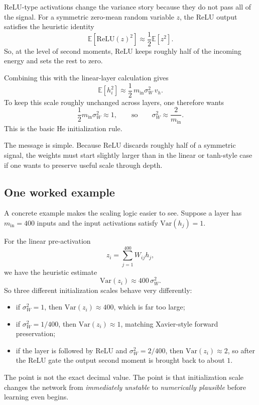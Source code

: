 ReLU-type activations change the variance story because they do not pass all of the signal.
For a symmetric zero-mean random variable $z$, the ReLU output satisfies the heuristic identity
\[
\mathbb E[\mathrm{ReLU}(z)^2] \approx \frac{1}{2}\mathbb E[z^2].
\]
So, at the level of second moments, ReLU keeps roughly half of the incoming energy and sets the rest to zero.

\medskip

Combining this with the linear-layer calculation gives
\[
\mathbb E[h_i^2]
\approx
\frac{1}{2}\,m_{\mathrm{in}}\sigma_W^2\,v_h.
\]
To keep this scale roughly unchanged across layers, one therefore wants
\[
\frac{1}{2}m_{\mathrm{in}}\sigma_W^2 \approx 1,
\qquad\text{so}
\qquad
\sigma_W^2 \approx \frac{2}{m_{\mathrm{in}}}.
\]
This is the basic He initialization rule.

\medskip

The message is simple.
Because ReLU discards roughly half of a symmetric signal, the weights must start slightly larger than in the linear or tanh-style case if one wants to preserve useful scale through depth.

\subsection*{One worked example}

A concrete example makes the scaling logic easier to see.
Suppose a layer has $m_{\mathrm{in}}=400$ inputs and the input activations satisfy $\mathrm{Var}(h_j)=1$.

\begin{example}
For the linear pre-activation
\[
z_i=\sum_{j=1}^{400}W_{ij}h_j,
\]
we have the heuristic estimate
\[
\mathrm{Var}(z_i)\approx 400\,\sigma_W^2.
\]
So three different initialization scales behave very differently:
\begin{itemize}
    \item if $\sigma_W^2=1$, then $\mathrm{Var}(z_i)\approx 400$, which is far too large;
    \item if $\sigma_W^2=1/400$, then $\mathrm{Var}(z_i)\approx 1$, matching Xavier-style forward preservation;
    \item if the layer is followed by ReLU and $\sigma_W^2=2/400$, then $\mathrm{Var}(z_i)\approx 2$, so after the ReLU gate the output second moment is brought back to about $1$.
\end{itemize}
The point is not the exact decimal value.
The point is that initialization scale changes the network from \emph{immediately unstable} to \emph{numerically plausible} before learning even begins.
\end{example}

